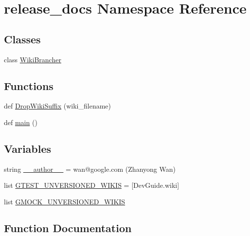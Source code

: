 \hypertarget{namespacerelease__docs}{}\section{release\+\_\+docs Namespace Reference}
\label{namespacerelease__docs}
\subsection*{Classes}
\begin{DoxyCompactItemize}
\item 
class \hyperlink{classrelease__docs_1_1WikiBrancher}{Wiki\+Brancher}
\end{DoxyCompactItemize}
\subsection*{Functions}
\begin{DoxyCompactItemize}
\item 
def \hyperlink{namespacerelease__docs_a6ea19a5ee397ce9f0565b90943d50e7f}{Drop\+Wiki\+Suffix} (wiki\+\_\+filename)
\item 
def \hyperlink{namespacerelease__docs_ac4eb92814ebe701e3936d1bfdd2ecf73}{main} ()
\end{DoxyCompactItemize}
\subsection*{Variables}
\begin{DoxyCompactItemize}
\item 
string \hyperlink{namespacerelease__docs_a552c656ae88e89e818b44f18fa40967b}{\+\_\+\+\_\+author\+\_\+\+\_\+} = \textquotesingle{}wan@google.\+com (Zhanyong Wan)\textquotesingle{}
\item 
list \hyperlink{namespacerelease__docs_aaeabb8c74d9db7a4b2f3c66e8f1a04ee}{G\+T\+E\+S\+T\+\_\+\+U\+N\+V\+E\+R\+S\+I\+O\+N\+E\+D\+\_\+\+W\+I\+K\+IS} = \mbox{[}\textquotesingle{}Dev\+Guide.\+wiki\textquotesingle{}\mbox{]}
\item 
list \hyperlink{namespacerelease__docs_a675f92ba4643a6aef7773a6178e49b29}{G\+M\+O\+C\+K\+\_\+\+U\+N\+V\+E\+R\+S\+I\+O\+N\+E\+D\+\_\+\+W\+I\+K\+IS}
\end{DoxyCompactItemize}


\subsection{Function Documentation}
\mbox{\label{namespacerelease__docs_a6ea19a5ee397ce9f0565b90943d50e7f}} 
